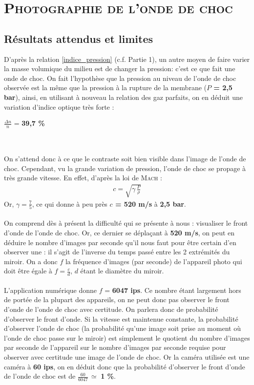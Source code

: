 \renewcommand{\chaptername}{\scshape Partie}
\chapter{\normalfont \scshape Photographie de l'onde de choc}
\section{Résultats attendus et limites}
D’après la relation \ref{indice_pression} (c.f. Partie 1), un autre moyen de faire varier la masse volumique du milieu est de changer la pression: c’est ce que fait une onde de choc. On fait l’hypothèse que la pression au niveau de l’onde de choc observée est la même que la pression à la rupture de la membrane (\textbf{$P$ = 2,5 bar}), ainsi, en utilisant à nouveau la relation des gaz parfaits, on en déduit une variation d’indice optique très forte  : \\
\centerline{$\frac{\Delta n}{n}$ = \textbf{39,7 \%}}\\ \\
On s'attend donc à ce que le contraste soit bien visible dans l'image de l'onde de choc. Cependant, vu la grande variation de pression, l'onde de choc se propage à très grande vitesse. En effet, d'après la loi de \textsc{Mach} :
\begin{align}
	c= \sqrt{\gamma\,\frac{P}{\rho}}
\end{align}
Or, $\gamma = \frac{7}{5}$, ce qui donne à peu près \textbf{$c$ = 520 m/s} à \textbf{2,5 bar}.\\\\
On comprend dès à présent la difficulté qui se présente à nous : visualiser le front d’onde de l’onde de choc. Or, ce dernier se déplaçant à \textbf{520 m/s}, on peut en déduire le nombre d’images par seconde qu’il nous faut pour être certain d’en observer une : il s’agit de l’inverse du temps passé entre les 2 extrémités du miroir. On a donc $f$ la fréquence d’images (par seconde) de l’appareil photo qui doit être égale à $f = \frac{c}{d}$, $d$ étant le diamètre du miroir.
\\
\\
L’application numérique donne $f$ = \textbf{6047 ips}. Ce nombre étant largement hors de portée de la plupart des appareils, on ne peut donc pas observer le front d’onde de l’onde de choc avec certitude. On parlera donc de probabilité d’observer le front d’onde. Si la vitesse est maintenue constante, la probabilité d’observer l’onde de choc (la probabilité qu’une image soit prise au moment où l’onde de choc passe sur le miroir) est simplement le quotient du nombre d’images par seconde de l’appareil sur le nombre d’images par seconde requise pour observer avec certitude une image de l’onde de choc. Or la caméra utilisée est une caméra à \textbf{60 ips}, on en déduit donc que la probabilité d’observer le front d’onde de l’onde de choc est de $\frac{60}{6047}\,\simeq$ \textbf{1 \%}.
